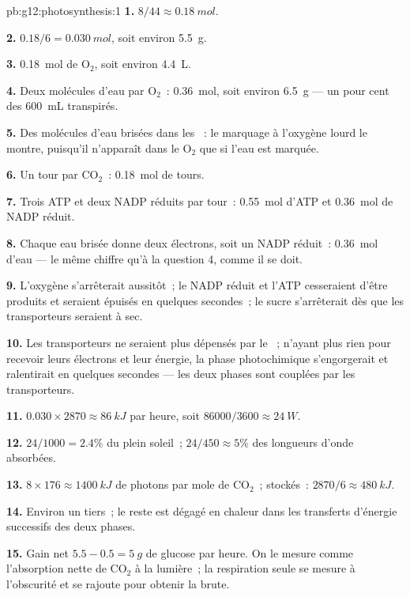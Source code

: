 \begin{solution}{pb:g12:photosynthesis:1}
\textbf{1.} $8/44 \approx \qty{0.18}{mol}$.

\textbf{2.} $0.18/6 = \qty{0.030}{mol}$, soit environ \qty{5.5}{g}.

\textbf{3.} \qty{0.18}{mol} de $\mathrm{O_2}$, soit environ
\qty{4.4}{L}.

\textbf{4.} Deux molécules d'eau par $\mathrm{O_2}$~: \qty{0.36}{mol},
soit environ \qty{6.5}{g} --- un pour cent des \qty{600}{mL}
transpirés.

\textbf{5.} Des molécules d'eau brisées dans les ~: le
marquage à l'oxygène lourd le montre, puisqu'il n'apparaît dans le
$\mathrm{O_2}$ que si l'eau est marquée.

\textbf{6.} Un tour par $\mathrm{CO_2}$~: \qty{0.18}{mol} de tours.

\textbf{7.} Trois ATP et deux NADP réduits par tour~: \qty{0.55}{mol}
d'ATP et \qty{0.36}{mol} de NADP réduit.

\textbf{8.} Chaque eau brisée donne deux électrons, soit un NADP
réduit~: \qty{0.36}{mol} d'eau --- le même chiffre qu'à la question 4,
comme il se doit.

\textbf{9.} L'oxygène s'arrêterait aussitôt~; le NADP réduit et l'ATP
cesseraient d'être produits et seraient épuisés en quelques secondes~;
le sucre s'arrêterait dès que les transporteurs seraient à sec.

\textbf{10.} Les transporteurs ne seraient plus dépensés par le ~; n'ayant plus rien pour recevoir leurs électrons et leur
énergie, la phase photochimique s'engorgerait et ralentirait en
quelques secondes --- les deux phases sont couplées par les
transporteurs.

\textbf{11.} $0.030 \times 2870 \approx \qty{86}{kJ}$ par heure, soit
$86000/3600 \approx \qty{24}{W}$.

\textbf{12.} $24/1000 = 2.4\%$ du plein soleil~; $24/450 \approx
5\%$ des longueurs d'onde absorbées.

\textbf{13.} $8 \times 176 \approx \qty{1400}{kJ}$ de photons par mole
de $\mathrm{CO_2}$~; stockés~: $2870/6 \approx \qty{480}{kJ}$.

\textbf{14.} Environ un tiers~; le reste est dégagé en chaleur dans
les transferts d'énergie successifs des deux phases.

\textbf{15.} Gain net $5.5 - 0.5 = \qty{5}{g}$ de glucose par heure.
On le mesure comme l'absorption nette de $\mathrm{CO_2}$ à la
lumière~; la respiration seule se mesure à l'obscurité et se rajoute
pour obtenir la  brute.


\end{solution}
